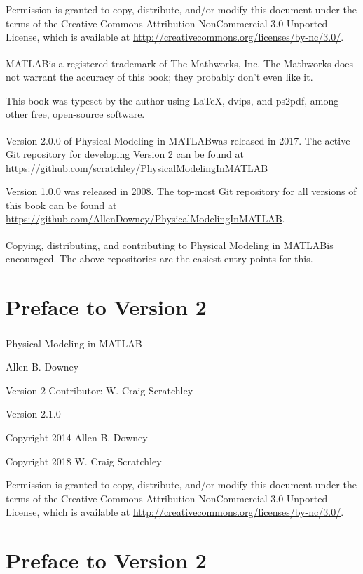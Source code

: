 \documentclass[
]{book}
\newcommand{\myreg}{\textsuperscript{{\tiny \textregistered}}}
\newcommand{\thetitle}{Physical Modeling in MATLAB\myreg}
\newcommand{\theversion}{2.1.0}
\begin{document}
\begin{latexonly}
\vspace{2em}

Permission is granted to copy, distribute, and/or modify this document
under the terms of the Creative Commons Attribution-NonCommercial 3.0 Unported
License, which is available at \url{http://creativecommons.org/licenses/by-nc/3.0/}.

MATLAB\myreg is a registered trademark of The
Mathworks, Inc.  The Mathworks does not warrant the accuracy
of this book; they probably don't even like it.

\vspace{2em}

This book was typeset by the author using \LaTeX, dvips, and ps2pdf,
among other free, open-source software.

Version 2.0.0 of \thetitle was released in 2017. The active Git
    repository for developing Version 2 can be found at
    \url{https://github.com/scratchley/PhysicalModelingInMATLAB}

Version 1.0.0 was released in 2008. The top-most Git repository
for all versions of this book can be found at
\url{https://github.com/AllenDowney/PhysicalModelingInMATLAB}.


Copying, distributing, and contributing to \thetitle is encouraged.
The above repositories are the easiest entry points for this.

\chapter{Preface to Version 2}
\end{latexonly}



\begin{htmlonly}


{\Large \thetitle}

{\large Allen B. Downey}

{\large Version 2 Contributor:  W. Craig Scratchley}

Version \theversion

Copyright 2014 Allen B. Downey

Copyright 2018 W. Craig Scratchley

\vspace{0.25in}

Permission is granted to copy, distribute, and/or modify this document
under the terms of the Creative Commons Attribution-NonCommercial 3.0
Unported License, which is available at
\url{http://creativecommons.org/licenses/by-nc/3.0/}.

\chapter*{Preface to Version 2} %

\end{htmlonly}
\end{document}
